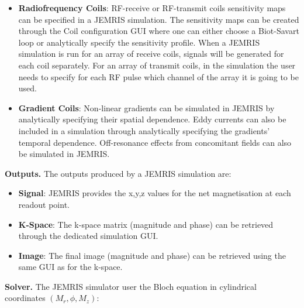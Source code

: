\begin{itemize}
    \item \textbf{Radiofrequency Coils}: RF-receive or RF-transmit coils sensitivity maps can be specified in a JEMRIS simulation. 
    The sensitivity maps can be created through the Coil configuration GUI where one can either choose a Biot-Savart loop or analytically specify the sensitivity profile.
    When a JEMRIS simulation is run for an array of receive coils, signals will be generated for each coil separately.
    For an array of transmit coils, in the simulation the user needs to specify for each RF pulse which channel of the array it is going to be used.
    
    \item \textbf{Gradient Coils}: Non-linear gradients can be simulated in JEMRIS by analytically specifying their spatial dependence.
    Eddy currents can also be included in a simulation through analytically specifying the gradients' temporal dependence.
    Off-resonance effects from concomitant fields can also be simulated in JEMRIS.
    
\end{itemize}


\hfill

\textbf{Outputs.} The outputs produced by a JEMRIS simulation are:
\begin{itemize}
    
    \item \textbf{Signal}: JEMRIS provides the x,y,z values for the net magnetisation at each readout point. 
    
    \item \textbf{K-Space}: The k-space matrix (magnitude and phase) can be retrieved through the dedicated simulation GUI.
    
    \item \textbf{Image}: The final image (magnitude and phase) can be retrieved using the same GUI as for the k-space.
    
\end{itemize}

\hfill

\textbf{Solver.} The JEMRIS simulator user the Bloch equation 
in cylindrical coordinates $(M_r, \phi, M_z)$:

